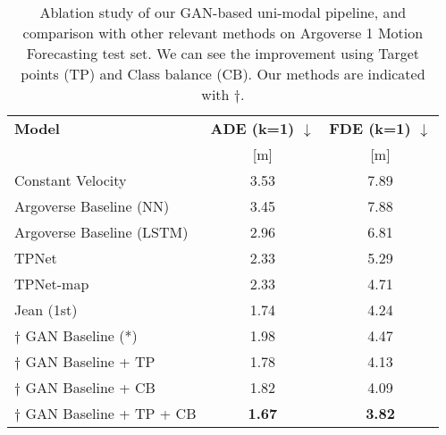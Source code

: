 \begin{table}[!h]
	\captionsetup{justification=justified}
	\caption[Ablation study of our Attention-based \ac{GAN} uni-modal pipeline, and comparison with other relevant methods on Argoverse 1 Motion Forecasting test set]{Ablation study of our \ac{GAN}-based uni-modal pipeline, and comparison with other relevant methods on Argoverse 1 Motion Forecasting test set. We can see the improvement using Target points (TP) and Class balance (CB). Our methods are indicated with $\dag$.}
	\begin{center}
		\begin{tabular}{ l | c | c }
			\toprule
			\textbf{Model} & \textbf{ADE (k=1) $\downarrow$} & \textbf{FDE (k=1) $\downarrow$} \\
			& [m] & [m] \\
			\midrule
			Constant Velocity \cite{chang2019argoverse} & 3.53 & 7.89 \\ 
			Argoverse Baseline (NN) \cite{chang2019argoverse} & 3.45  & 7.88 \\ 
			Argoverse Baseline (LSTM) \cite{chang2019argoverse} & 2.96  & 6.81 \\ 
			TPNet \cite{fang2020tpnet} & 2.33  & 5.29 \\ 
			TPNet-map \cite{fang2020tpnet} & 2.33  & 4.71 \\ 
			Jean (1st) \cite{chang2019argoverse, mercat2020multi} & 1.74  & 4.24 \\ 
			\midrule 
			$\dag$ \ac{GAN} Baseline (*) & 1.98  & 4.47 \\ 
			$\dag$ \ac{GAN} Baseline + TP & 1.78  & 4.13 \\
			$\dag$ \ac{GAN} Baseline + CB & 1.82  & 4.09 \\
			$\dag$ \ac{GAN} Baseline + TP + CB & \textbf{1.67}  & \textbf{3.82} \\
			\bottomrule
		\end{tabular}
		\label{table:5_model_results_test}
	\end{center}
\end{table}

